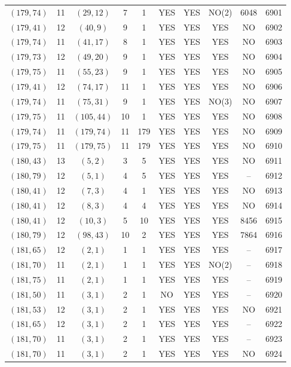 \begin{longtable}{|c|c|c|c|c|c|c|c|c|c|}
$(179, 74)$ & 11 & $(29, 12)$ & 7 & 1 & YES & YES & NO(2) & 6048 & 6901\\
$(179, 41)$ & 12 & $(40, 9)$ & 9 & 1 & YES & YES & YES & NO & 6902\\
$(179, 74)$ & 11 & $(41, 17)$ & 8 & 1 & YES & YES & YES & NO & 6903\\
$(179, 73)$ & 12 & $(49, 20)$ & 9 & 1 & YES & YES & YES & NO & 6904\\
$(179, 75)$ & 11 & $(55, 23)$ & 9 & 1 & YES & YES & YES & NO & 6905\\
$(179, 41)$ & 12 & $(74, 17)$ & 11 & 1 & YES & YES & YES & NO & 6906\\
$(179, 74)$ & 11 & $(75, 31)$ & 9 & 1 & YES & YES & NO(3) & NO & 6907\\
$(179, 75)$ & 11 & $(105, 44)$ & 10 & 1 & YES & YES & YES & NO & 6908\\
$(179, 74)$ & 11 & $(179, 74)$ & 11 & 179 & YES & YES & YES & NO & 6909\\
$(179, 75)$ & 11 & $(179, 75)$ & 11 & 179 & YES & YES & YES & NO & 6910\\
$(180, 43)$ & 13 & $(5, 2)$ & 3 & 5 & YES & YES & YES & NO & 6911\\
$(180, 79)$ & 12 & $(5, 1)$ & 4 & 5 & YES & YES & YES & -- & 6912\\
$(180, 41)$ & 12 & $(7, 3)$ & 4 & 1 & YES & YES & YES & NO & 6913\\
$(180, 41)$ & 12 & $(8, 3)$ & 4 & 4 & YES & YES & YES & NO & 6914\\
$(180, 41)$ & 12 & $(10, 3)$ & 5 & 10 & YES & YES & YES & 8456 & 6915\\
$(180, 79)$ & 12 & $(98, 43)$ & 10 & 2 & YES & YES & YES & 7864 & 6916\\
$(181, 65)$ & 12 & $(2, 1)$ & 1 & 1 & YES & YES & YES & -- & 6917\\
$(181, 70)$ & 11 & $(2, 1)$ & 1 & 1 & YES & YES & NO(2) & -- & 6918\\
$(181, 75)$ & 11 & $(2, 1)$ & 1 & 1 & YES & YES & YES & -- & 6919\\
$(181, 50)$ & 11 & $(3, 1)$ & 2 & 1 & NO & YES & YES & -- & 6920\\
$(181, 53)$ & 12 & $(3, 1)$ & 2 & 1 & YES & YES & YES & NO & 6921\\
$(181, 65)$ & 12 & $(3, 1)$ & 2 & 1 & YES & YES & YES & -- & 6922\\
$(181, 70)$ & 11 & $(3, 1)$ & 2 & 1 & YES & YES & YES & -- & 6923\\
$(181, 70)$ & 11 & $(3, 1)$ & 2 & 1 & YES & YES & YES & NO & 6924\\

\end{longtable}
